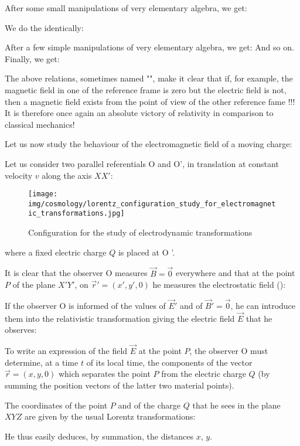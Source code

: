 	After some small manipulations of very elementary algebra, we get:
	
	We do the identically:
	
	After a few simple manipulations of very elementary algebra, we get:
	And so on. Finally, we get:
	
	The above relations, sometimes named "", make it clear that if, for example, the magnetic field in one of the reference frame is zero but the electric field is not, then a magnetic field exists from the point of view of the other reference fame !!! It is therefore once again an absolute victory of relativity in comparison to classical mechanics!

	Let us now study the behaviour of the electromagnetic field of a moving charge:

	Let us consider two parallel referentials O and O', in translation at constant velocity $v$ along the axis $XX'$:
	\begin{figure}[H]
		\centering
		\texttt{[image: img/cosmology/lorentz\_configuration\_study\_for\_electromagnetic\_transformations.jpg]}
		\caption{Configuration for the study of electrodynamic transformations}
	\end{figure}
	where a fixed electric charge $Q$ is placed at O '.

	It is clear that the observer O measures $\vec{B}=\vec{0}$ everywhere and that at the point $P$ of the plane $X 'Y'$, on $\vec{r}'=(x',y',0)$ he measures the electrostatic field ():
	
	If the observer O is informed of the values of $\vec{E}'$ and of $\vec{B}'=\vec{0}$, he can introduce them into the relativistic transformation giving the electric field $\vec{E}$ that he observes:
	
	To write an expression of the field $\vec{E}$ at the point $P$, the observer O must determine, at a time $t$ of its local time, the components of the vector $\vec{r}=(x,y,0)$ which separates the point $P$ from the electric charge $Q$ (by summing the position vectors of the latter two material points).

	The coordinates of the point $P$ and of the charge $Q$ that he sees in the plane $XYZ$ are given by the usual Lorentz transformations:
	
	He thus easily deduces, by summation, the distances $x$, $y$.

